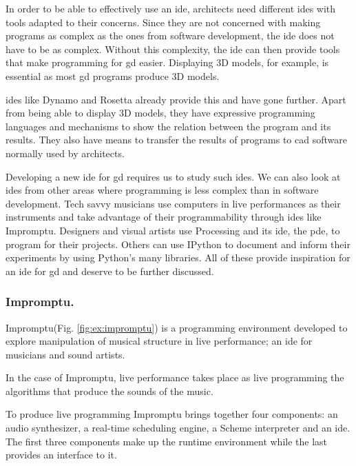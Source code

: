\documentclass{./llncs2e/llncs}
\begin{document}
	In order to be able to effectively use an \ac{ide}, architects need different \acp{ide} with tools adapted to their concerns.
	Since they are not concerned with making programs as complex as the ones from software development, the \ac{ide} does not have to be as complex.
	Without this complexity, the \ac{ide} can then provide tools that make programming for \ac{gd} easier.
	Displaying 3D models, for example, is essential as most \ac{gd} programs produce 3D models.
	
	\ac{ide}s like Dynamo\cite{dynamo2015site} and Rosetta\cite{de2012modern} already provide this and have gone further.
	Apart from being able to display 3D models, they have expressive programming languages and mechanisms to show the relation between the program and its results.
	They also have means to transfer the results of programs to \ac{cad} software normally used by architects.
	
	Developing a new \ac{ide} for \ac{gd} requires us to study such \ac{ide}s.
	We can also look at \acp{ide} from other areas where programming is less complex than in software development.
	Tech savvy musicians use computers in live performances as their instruments and take advantage of their programmability through \ac{ide}s like Impromptu.
	Designers and visual artists use Processing and its \ac{ide}, the \ac{pde}, to program for their projects.
	Others can use IPython to document and inform their experiments by using Python's many libraries.
	All of these provide inspiration for an \ac{ide} for \ac{gd} and deserve to be further discussed.
	
\subsubsection{Impromptu.}
	Impromptu\cite{sorensen2005impromptu,sorensen2010programming}(Fig. \ref{fig:ex:impromptu}) is a programming environment developed to explore manipulation of musical structure in live performance; an \ac{ide} for musicians and sound artists.
	
	In the case of Impromptu, live performance takes place as live programming the algorithms that produce the sounds of the music.
	
	To produce live programming Impromptu brings together four components: an audio synthesizer, a real-time scheduling engine, a Scheme interpreter and an \ac{ide}. 
	The first three components make up the runtime environment while the last provides an interface to it\cite{sorensen2005impromptu}. 
	
\end{document}
